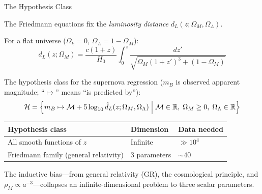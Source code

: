 \documentclass[aspectratio=169]{beamer}
\begin{document}
\begin{frame}{The Hypothesis Class}

The Friedmann equations fix the \emph{luminosity distance}
$d_L(z;\Omega_M,\Omega_\Lambda)$.

\medskip
For a flat universe ($\Omega_k = 0$, $\Omega_\Lambda = 1 - \Omega_M$):
\[
  d_L(z;\Omega_M) =
  \frac{c(1+z)}{H_0}\int_0^z\frac{dz'}
  {\sqrt{\Omega_M(1+z')^3 + (1-\Omega_M)}}
\]

\medskip
The hypothesis class for the supernova regression ($m_B$ is observed
apparent magnitude; ``$\mapsto$'' means ``is predicted by''):
\[
  \mathcal{H} = \Bigl\{
    m_B \mapsto \mathcal{M} + 5\log_{10}\tilde d_L(z;\Omega_M,\Omega_\Lambda)
    \Bigm|
    \mathcal{M}\in\mathbb{R},\;
    \Omega_M \geq 0,\;
    \Omega_\Lambda \in\mathbb{R}
  \Bigr\}
\]

\medskip
\begin{center}
\begin{tabular}{lll}
\toprule
Hypothesis class & Dimension & Data needed \\
\midrule
All smooth functions of $z$ & Infinite & $\gg 10^4$ \\
Friedmann family (general relativity) & 3 parameters & $\sim 40$ \\
\bottomrule
\end{tabular}
\end{center}

\medskip
The inductive bias---from general relativity (GR), the cosmological
principle, and $\rho_M \propto a^{-3}$---collapses an infinite-dimensional
problem to three scalar parameters.

\end{frame}
\end{document}
